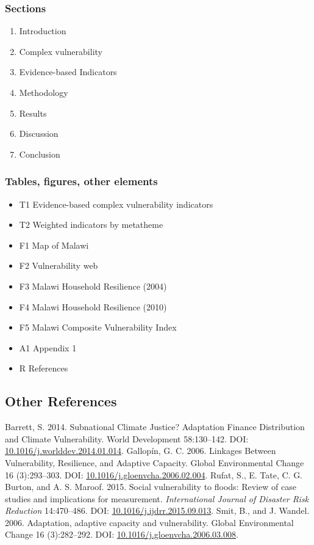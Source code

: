 \documentclass[
]{article}
\providecommand{\tightlist}{%
  \setlength{\itemsep}{0pt}\setlength{\parskip}{0pt}}
\begin{document}
\hypertarget{sections}{%
\subsubsection{Sections}\label{sections}}

\begin{enumerate}
\def\labelenumi{\arabic{enumi}.}
\tightlist
\item
  Introduction
\item
  Complex vulnerability
\item
  Evidence-based Indicators
\item
  Methodology
\item
  Results
\item
  Discussion
\item
  Conclusion
\end{enumerate}

\hypertarget{tables-figures-other-elements}{%
\subsubsection{Tables, figures, other
elements}\label{tables-figures-other-elements}}

\begin{itemize}
\tightlist
\item
  T1 Evidence-based complex vulnerability indicators
\item
  T2 Weighted indicators by metatheme
\item
  F1 Map of Malawi
\item
  F2 Vulnerability web
\item
  F3 Malawi Household Resilience (2004)
\item
  F4 Malawi Household Resilience (2010)
\item
  F5 Malawi Composite Vulnerability Index
\item
  A1 Appendix 1
\item
  R References
\end{itemize}

\hypertarget{other-references}{%
\subsection{Other References}\label{other-references}}

Barrett, S. 2014. Subnational Climate Justice? Adaptation Finance
Distribution and Climate Vulnerability. World Development 58:130--142.
DOI:
\href{http://dx.doi.org/10.1016/j.worlddev.2014.01.014}{10.1016/j.worlddev.2014.01.014}.
Gallopín, G. C. 2006. Linkages Between Vulnerability, Resilience, and
Adaptive Capacity. Global Environmental Change 16 (3):293--303. DOI:
\href{https://doi.org/10.1016/j.gloenvcha.2006.02.004}{10.1016/j.gloenvcha.2006.02.004}.
Rufat, S., E. Tate, C. G. Burton, and A. S. Maroof. 2015. Social
vulnerability to floods: Review of case studies and implications for
measurement. \emph{International Journal of Disaster Risk Reduction}
14:470--486. DOI:
\href{http://dx.doi.org/10.1016/j.ijdrr.2015.09.013}{10.1016/j.ijdrr.2015.09.013}.
Smit, B., and J. Wandel. 2006. Adaptation, adaptive capacity and
vulnerability. Global Environmental Change 16 (3):282--292. DOI:
\href{https://doi.org/10.1016/j.gloenvcha.2006.03.008}{10.1016/j.gloenvcha.2006.03.008}.
\end{document}
